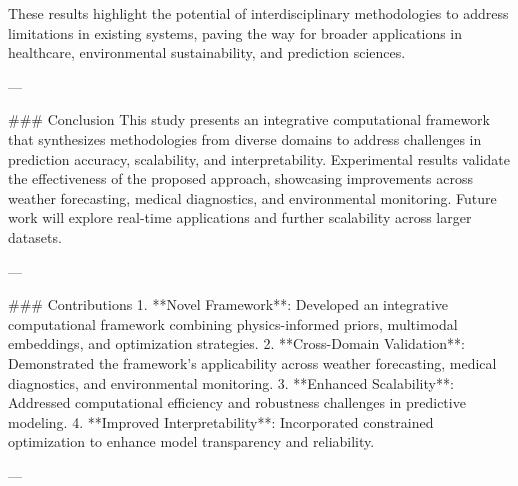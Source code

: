 These results highlight the potential of interdisciplinary methodologies to address limitations in existing systems, paving the way for broader applications in healthcare, environmental sustainability, and prediction sciences.

---

### Conclusion  
This study presents an integrative computational framework that synthesizes methodologies from diverse domains to address challenges in prediction accuracy, scalability, and interpretability. Experimental results validate the effectiveness of the proposed approach, showcasing improvements across weather forecasting, medical diagnostics, and environmental monitoring. Future work will explore real-time applications and further scalability across larger datasets.

---

### Contributions  
1. **Novel Framework**: Developed an integrative computational framework combining physics-informed priors, multimodal embeddings, and optimization strategies.  
2. **Cross-Domain Validation**: Demonstrated the framework's applicability across weather forecasting, medical diagnostics, and environmental monitoring.  
3. **Enhanced Scalability**: Addressed computational efficiency and robustness challenges in predictive modeling.  
4. **Improved Interpretability**: Incorporated constrained optimization to enhance model transparency and reliability.  

---